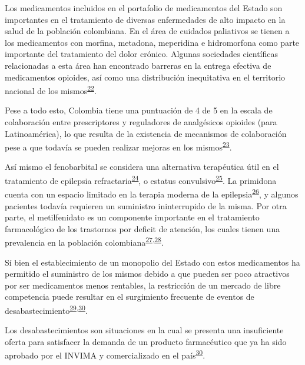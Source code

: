 \documentclass[
  oneside]{book}
\begin{document}
Los medicamentos incluidos en el portafolio de medicamentos del Estado son importantes en el tratamiento de diversas enfermedades de alto impacto en la salud de la población colombiana. En el área de cuidados paliativos se tienen a los medicamentos con morfina, metadona, meperidina e hidromorfona como parte importante del tratamiento del dolor crónico. Algunas sociedades científicas relacionadas a esta área han encontrado barreras en la entrega efectiva de medicamentos opioides, así como una distribución inequitativa en el territorio nacional de los mismos\textsuperscript{\protect\hyperlink{ref-LeonDelgado2018}{22}}.

Pese a todo esto, Colombia tiene una puntuación de 4 de 5 en la escala de colaboración entre prescriptores y reguladores de analgésicos opioides (para Latinoamérica), lo que resulta de la existencia de mecanismos de colaboración pese a que todavía se pueden realizar mejoras en los mismos\textsuperscript{\protect\hyperlink{ref-Pastrana2020}{23}}.

Así mismo el fenobarbital se considera una alternativa terapéutica útil en el tratamiento de epilepsia refractaria\textsuperscript{\protect\hyperlink{ref-WatsonLewis2014}{24}}, o estatus convulsivo\textsuperscript{\protect\hyperlink{ref-VergaraAguilar2019}{25}}. La primidona cuenta con un espacio limitado en la terapia moderna de la epilepsia\textsuperscript{\protect\hyperlink{ref-Johannessen2020}{26}}, y algunos pacientes todavía requieren un suministro ininterrupido de la misma. Por otra parte, el metilfenidato es un componente importante en el tratamiento farmacológico de los trastornos por deficit de atención, los cuales tienen una prevalencia en la población colombiana\textsuperscript{\protect\hyperlink{ref-Pineda2001}{27},\protect\hyperlink{ref-Llanos-Lizcanoa2019}{28}}.

Sí bien el establecimiento de un monopolio del Estado con estos medicamentos ha permitido el suministro de los mismos debido a que pueden ser poco atractivos por ser medicamentos menos rentables, la restricción de un mercado de libre competencia puede resultar en el surgimiento frecuente de eventos de desabastecimiento\textsuperscript{\protect\hyperlink{ref-LopezLopez2021}{29},\protect\hyperlink{ref-INVIMA2018-Desabast}{30}}.

Los desabastecimientos son situaciones en la cual se presenta una insuficiente oferta para satisfacer la demanda de un producto farmacéutico que ya ha sido aprobado por el INVIMA y comercializado en el país\textsuperscript{\protect\hyperlink{ref-INVIMA2018-Desabast}{30}}.
\end{document}
